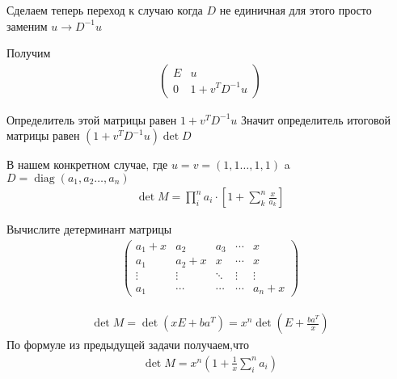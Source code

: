\begin{sol}
    Сделаем теперь переход к случаю когда $D$ не единичная
    для этого просто заменим $u \rightarrow D^{-1} u$
    
    Получим
    \begin{gather}
        \left(
         \begin{array}{cc}
            E &  u\\
           0  & 1 + v^T D^{-1} u
        \end{array}
        \right)
    \end{gather}
    
    Определитель этой матрицы равен $1 + v^T D^{-1} u$
    Значит определитель итоговой матрицы равен $(1 + v^T D^{-1} u )\det D$
    
    
    В нашем конкретном случае, где $u = v  =  \left(1,1\dots,1,1\right)$ a $D = \operatorname{diag}(a_1, a_2 \dots, a_n)$
    \begin{gather*}
        \det M = \prod_{i}^n a_{i} \cdot \left[1 + \sum_{k}^n \frac{x}{a_k}\right]
    \end{gather*}
\end{sol}

\begin{prb}
    Вычислите детерминант матрицы
    \begin{gather*}
        \left(
        \begin{array}{ccccc}
           a_{1} + x &  a_{2} &  a_{3} & \cdots & x\\
           a_{1}  &  a_{2} + x & x & \cdots & x\\
           \vdots & \vdots & \ddots& \vdots & \vdots\\
           a_{1} & \cdots & \cdots & \cdots & a_{n} + x
        \end{array}
        \right)
    \end{gather*}
\end{prb}

\begin{sol}
    \begin{gather*}
        \det M =  \det (x E +  b a^{T}) = x^n \det\left(E +  \frac{ba^{T}}{x}\right)
    \end{gather*}
    По формуле из предыдущей задачи получаем,что
    \begin{gather*}
        \det M = x^n \left(1+ \frac{1}{x}\sum_{i}^{n} a_{i}\right)
    \end{gather*}
\end{sol}
    
